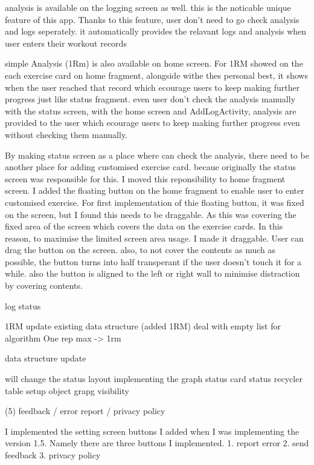 analysis is available on the logging screen as well.
this is the noticable unique feature of this app. 
Thanks to this feature, user don't need to go check analysis and logs seperately.
it automatically provides the relavant logs and analysis when user enters their workout records

simple Analysis (1Rm) is also available on home screen. 
For 1RM showed on the each exercise card on home fragment, 
alongside withe thes personal best, it shows when the user reached that record which ecourage users to keep making further progress just like status fragment.
even user don't check the analysis manually with the status screen,
with the home screen and AddLogActivity, analysis are provided to the user which ecourage users to keep making further progress even without checking them manually.

By making status screen as a place where can check the analysis,
there need to be another place for adding customised exercise card.
becaue originally the status screen was responsible for this.
I moved this reponsibility to home fragment screen.
I added the floating button on the home fragment to enable user to enter customised exercise.
For first implementation of thie floating button, it was fixed on the screen, 
but I found this needs to be draggable.
As this was covering the fixed area of the screen which covers the data on the exercise cards.
In this reason, to maximise the limited screen area usage. I made it draggable.
User can drag the button on the screen.
also, to not cover the contents as much as possible,
the button turns into half transperant if the user doesn't touch it for a while.
also the button is aligned to the left or right wall to minimise distraction by covering contents.



log 
status

\predicted 1RM
update existing data structure (added 1RM)
deal with empty list for algorithm
One rep max -> 1rm

data structure update


will change the status layout
implementing the graph
status card
status recycler
table setup object
grapg visibility



(5) feedback / error report / privacy policy

I implemented the setting screen buttons I added when I was implementing the version 1.5.
Namely there are three buttons I implemented.
1. report error 
2. send feedback 
3. privacy policy 

